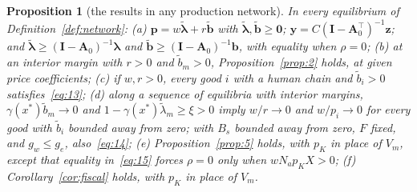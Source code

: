 \documentclass[12pt]{article}
\theoremstyle{plain}
\newtheorem{proposition}{Proposition}
\theoremstyle{definition}
\theoremstyle{remark}
\begin{document}
\begin{proposition}[the results in any production network]\label{prop:network}
In every equilibrium of Definition~\ref{def:network}:
(a) $\mathbf p=w\widetilde{\bm\lambda}+r\widetilde{\mathbf b}$ with $\widetilde{\bm\lambda},\widetilde{\mathbf b}\ge\mathbf 0$; $\mathbf y=C(\mathbf I-\mathbf A_0^{\top})^{-1}\mathbf z$; and $\widetilde{\bm\lambda}\ge(\mathbf I-\mathbf A_0)^{-1}\bm\lambda$ and $\widetilde{\mathbf b}\ge(\mathbf I-\mathbf A_0)^{-1}\mathbf b$, with equality when $\rho=0$;
(b) at an interior margin with $r>0$ and $\widetilde b_m>0$, Proposition~\ref{prop:2} holds, at given price coefficients;
(c) if $w,r>0$, every good $i$ with a human chain and $\widetilde b_i>0$ satisfies~\eqref{eq:13};
(d) along a sequence of equilibria with interior margins, $\gamma(x^*)\widetilde b_m\to0$ and $1-\gamma(x^*)\widetilde\lambda_m\ge\xi>0$ imply $w/r\to0$ and $w/p_i\to0$ for every good with $\widetilde b_i$ bounded away from zero; with $B_s$ bounded away from zero, $F$ fixed, and $g_w\le g_e$, also~\eqref{eq:14};
(e) Proposition~\ref{prop:5} holds, with $p_K$ in place of $V_m$, except that equality in~\eqref{eq:15} forces $\rho=0$ only when $wN_ap_KX>0$;
(f) Corollary~\ref{cor:fiscal} holds, with $p_K$ in place of $V_m$.
\end{proposition}
\end{document}
